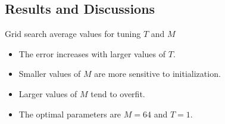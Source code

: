 \subsection{Results and Discussions}

\begin{frame}{Grid search average values for tuning $T$ and $M$}
	\vspace{-1em}
	\begin{figure}[htbp]
		\setlength{} 
		\setlength{}
		\hspace{-1em}
	\end{figure}
	\vspace{-1.5em}
	\begin{itemize}
		\item The error increases with larger values of \( T \).
		\item Smaller values of \( M \) are more sensitive to initialization.
		\item Larger values of \( M \) tend to overfit.
		\item The optimal parameters are \( M = 64 \) and \( T = 1 \).
	\end{itemize}

\end{frame}

